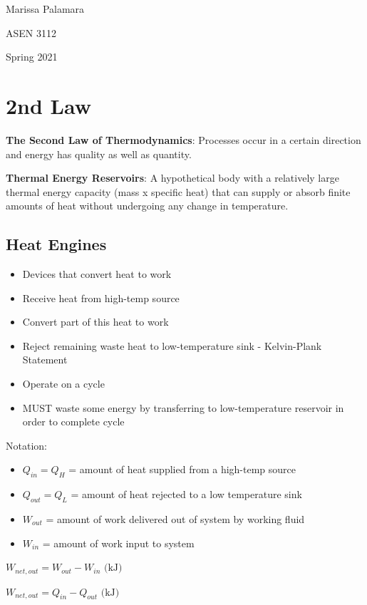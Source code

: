 \documentclass{article}
\begin{document}
\begin{multicols}{3}
    Marissa Palamara\par 
    ASEN 3112\par 
    Spring 2021
    \section*{2nd Law}
    \textbf{The Second Law of Thermodynamics}: Processes occur in a certain direction and energy has quality as well as quantity.\par
    \textbf{Thermal Energy Reservoirs}: A hypothetical body with a relatively large thermal energy capacity (mass x specific heat) that can supply or absorb finite amounts of heat without undergoing any change in temperature. 
    \subsection*{Heat Engines}
    \begin{itemize}
        \item Devices that convert heat to work
        \item Receive heat from high-temp source
        \item Convert part of this heat to work
        \item Reject remaining waste heat to low-temperature sink - Kelvin-Plank Statement
        \item Operate on a cycle
        \item MUST waste some energy by transferring to low-temperature reservoir in order to complete cycle
    \end{itemize}
    Notation:
    \begin{itemize}
        \item $Q_{in}=Q_H$ = amount of heat supplied from a high-temp source
        \item $Q_{out}=Q_L$ = amount of heat rejected to a low temperature sink
        \item $W_{out}$ = amount of work delivered out of system by working fluid
        \item $W_{in}$ = amount of work input to system
    \end{itemize}
    $W_{net,out}=W_{out}-W_{in}\text{ (kJ)}$\par 
    $W_{net,out}=Q_{in}-Q_{out}\text{ (kJ)}$

\end{multicols}
\end{document}
